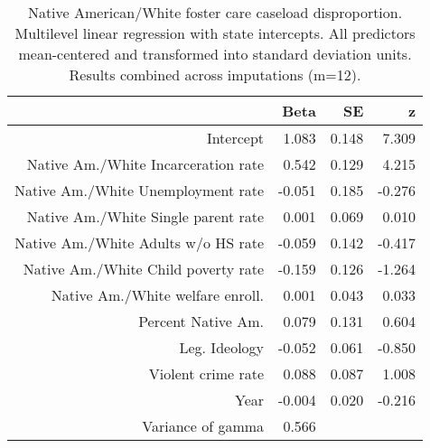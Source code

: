 \begin{table}[ht]
\centering
\caption{Native American/White foster care caseload disproportion. Multilevel linear regression with state intercepts. 
             All predictors mean-centered and transformed into standard deviation units.
             Results combined across imputations (m=12).} 
\label{a.d.tab}
\begin{tabular}{rrrr}
  \hline
 & Beta & SE & z \\ 
  \hline
Intercept & 1.083 & 0.148 & 7.309 \\ 
  Native Am./White Incarceration rate & 0.542 & 0.129 & 4.215 \\ 
  Native Am./White Unemployment rate & -0.051 & 0.185 & -0.276 \\ 
  Native Am./White Single parent rate & 0.001 & 0.069 & 0.010 \\ 
  Native Am./White Adults w/o HS rate & -0.059 & 0.142 & -0.417 \\ 
  Native Am./White Child poverty rate & -0.159 & 0.126 & -1.264 \\ 
  Native Am./White welfare enroll. & 0.001 & 0.043 & 0.033 \\ 
  Percent Native Am. & 0.079 & 0.131 & 0.604 \\ 
  Leg. Ideology & -0.052 & 0.061 & -0.850 \\ 
  Violent crime rate & 0.088 & 0.087 & 1.008 \\ 
  Year & -0.004 & 0.020 & -0.216 \\ 
  Variance of gamma & 0.566 &  &  \\ 
   \hline
\end{tabular}
\end{table}
